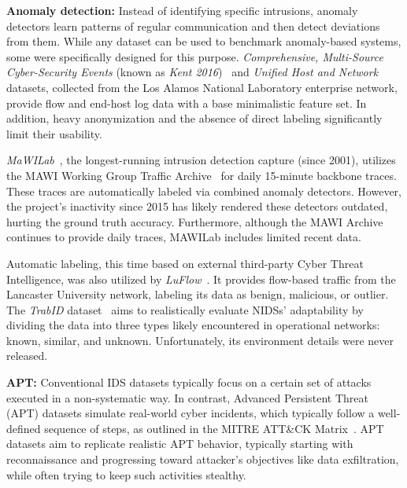 \textbf{Anomaly detection:}
Instead of identifying specific intrusions, anomaly detectors learn patterns of regular communication and then detect deviations from them. While any dataset can be used to benchmark anomaly-based systems, some were specifically designed for this purpose. \emph{Comprehensive, Multi-Source Cyber-Security Events} (known as \emph{Kent 2016})~\cite{kent2016_cybersecdata_dynamicnet} and \emph{Unified Host and Network}~\cite{turcotte2019_unified} datasets, collected from the Los Alamos National Laboratory enterprise network, provide flow and end-host log data with a base minimalistic feature set. In addition, heavy anonymization and the absence of direct labeling significantly limit their usability.

\emph{MaWILab}~\cite{fontugne2010_mawilab}, the longest-running intrusion detection capture (since 2001), utilizes the MAWI Working Group Traffic Archive~\cite{mawi2024_mawi_wg_traffic_archive} for daily 15-minute backbone traces. These traces are automatically labeled via combined anomaly detectors. However, the project's inactivity since 2015 has likely rendered these detectors outdated, hurting the ground truth accuracy. Furthermore, although the MAWI Archive continues to provide daily traces, MAWILab includes limited recent data.

Automatic labeling, this time based on external third-party Cyber Threat Intelligence, was also utilized by \emph{LuFlow}~\cite{mills2022_luflow}. It provides flow-based traffic from the Lancaster University network, labeling its data as benign, malicious, or outlier. The \emph{TrabID} dataset~\cite{viegas2017_trabid_dataset} aims to realistically evaluate NIDSs' adaptability by dividing the data into three types likely encountered in operational networks: known, similar, and unknown. Unfortunately, its environment details were never released.

\textbf{APT:}
Conventional IDS datasets typically focus on a certain set of attacks executed in a non-systematic way. In contrast, Advanced Persistent Threat (APT) datasets simulate real-world cyber incidents, which typically follow a well-defined sequence of steps, as outlined in the MITRE ATT\&CK Matrix~\cite{mitre2024_mitre_attck}. APT datasets aim to replicate realistic APT behavior, typically starting with reconnaissance and progressing toward attacker's objectives like data exfiltration, while often trying to keep such activities stealthy.

